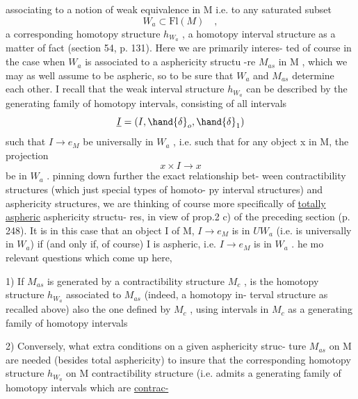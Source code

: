 
associating to a notion of weak equivalence in M i.e. to any saturated
subset 
\[ W_a \subset \mathrm{Fl}(M) \quad , \]
a corresponding homotopy structure $h_{W_a}$ ,\xout{,} a homotopy interval structure
as a matter of fact (section 54, p. 131).  Here we are primarily interes-%
ted of course in the case when $W_a$ is associated to a  asphericity structu
-re $M_{as}$ in M , which we may as well assume to be aspheric, so   to
be sure that $W_a$ and $M_{as}$ determine each other.  I recall that the weak
interval structure $h_{W_a}$  can be described by the generating family of
homotopy intervals, consisting of all intervals
\[ \underline{I} = (I,\hand{\delta}_o,\hand{\delta}_1) \]
such that $I \to e_M$ be universally in $W_a$ , i.e. such that for any object
x in M, the projection
\[ x \times I \longrightarrow x \]
be in $W_a$ .    pinning down further the exact relationship bet-%
ween contractibility structures (which   just special types of homoto-%
py interval structures) and asphericity structures, we are thinking of
course  more specifically of \uline{totally} \uline{aspheric} asphericity structu-%
res, in view of prop.2 c) of the preceding section (p. 248).  It is   in this case that   an object I of M,
$I \to e_M$ is in $UW_a$ (i.e. is universally in $W_a$)  if (and only if,
of course) I is aspheric, i.e. $I \longrightarrow e_M$ is in $W_a$ .   he mo relevant questions which come up here, 
 

1)  If $M_{as}$ is generated by a contractibility structure $M_c$ ,  is the
homotopy structure $h_{W_a}$ associated to $M_{as}$  (indeed, a  homotopy in-%
terval structure as recalled above) also the one defined by $M_c$ ,  using
intervals in $M_c$ as a generating family of homotopy intervals

2)  Conversely, what extra conditions on a given asphericity struc-%
ture $M_{as}$ on M are needed (besides total asphericity) to insure that the
corresponding homotopy structure $h_{W_a}$ on M   contractibility structure 
(i.e. admits a generating family of homotopy intervals which are \uline{contrac-}%

